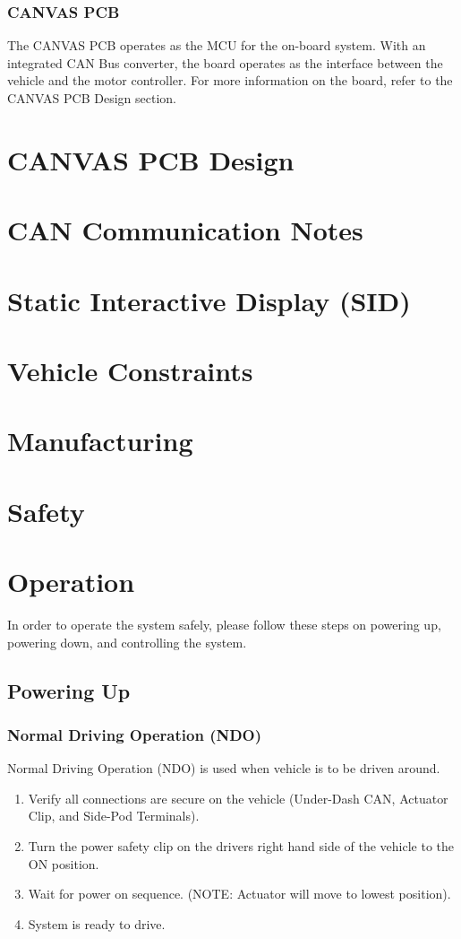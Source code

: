 \documentclass{article}
\begin{document}
\subsubsection{CANVAS PCB}
The CANVAS PCB operates as the MCU for the on-board system. With an integrated CAN Bus converter, the board operates as the interface between the vehicle and the motor controller. For more information on the board, refer to the CANVAS PCB Design section. 

\section{CANVAS PCB Design}
\section{CAN Communication Notes}
\section{Static Interactive Display (SID)}
\section{Vehicle Constraints}
\section{Manufacturing}
\section{Safety}

\section{Operation}
In order to operate the system safely, please follow these steps on powering up, powering down, and controlling the system.
\subsection{Powering Up}
\subsubsection{Normal Driving Operation (NDO)}
Normal Driving Operation (NDO) is used when vehicle is to be driven around.
\begin{enumerate}
    \item Verify all connections are secure on the vehicle (Under-Dash CAN, Actuator Clip, and Side-Pod Terminals).
    \item Turn the power safety clip on the drivers right hand side of the vehicle to the ON position.
    \item Wait for power on sequence. (NOTE: Actuator will move to lowest position).
    \item System is ready to drive.
\end{enumerate}
\end{document}
